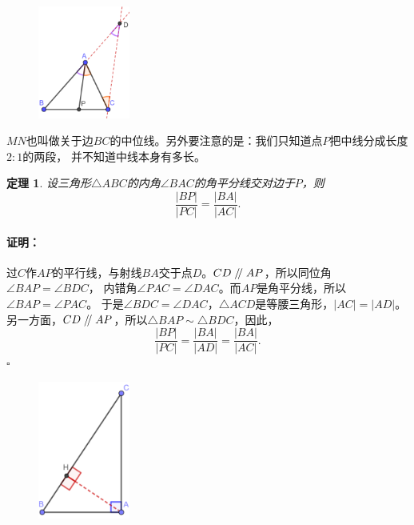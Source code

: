 \documentclass[12pt,UTF8]{ctexbook}
\newtheorem{tm}{定理}[section]
\newenvironment{proof2}{\paragraph{\textbf{证明：}}}{\hfill$\square$}
\renewcommand\parallel{\mathrel{/\mskip-4mu/}}
\begin{document}
\begin{figure} %
    \vspace{-10pt}
    \includegraphics[width=0.27\textwidth]{tu/三角形9.png}
\end{figure}

$MN$也叫做关于边$BC$的中位线。另外要注意的是：我们只知道点$P$把中线分成长度$2:1$的两段，
并不知道中线本身有多长。

\begin{tm}\label{tm:0-2-1}
    设三角形$\triangle ABC$的内角$\angle BAC$的角平分线交对边于$P$，则
    $$ \frac{|BP|}{|PC|} = \frac{|BA|}{|AC|}.$$
\end{tm}
\begin{proof2}
    过$C$作$AP$的平行线，与射线$BA$交于点$D$。$CD \parallel AP$，所以同位角$\angle BAP = \angle BDC$，
    内错角$\angle PAC = \angle DAC$。而$AP$是角平分线，所以$\angle BAP = \angle PAC$。
    于是$\angle BDC = \angle DAC$，$\triangle ACD$是等腰三角形，$|AC| = |AD|$。\\
    另一方面，$CD \parallel AP$，所以$\triangle BAP \sim \triangle BDC$，因此，
    $$\frac{|BP|}{|PC|} = \frac{|BA|}{|AD|} = \frac{|BA|}{|AC|}.$$
\end{proof2}

\begin{figure} %
    \vspace{-80pt}
    \includegraphics[width=0.27\textwidth]{tu/三角形10.png}
\end{figure}
\end{document}
